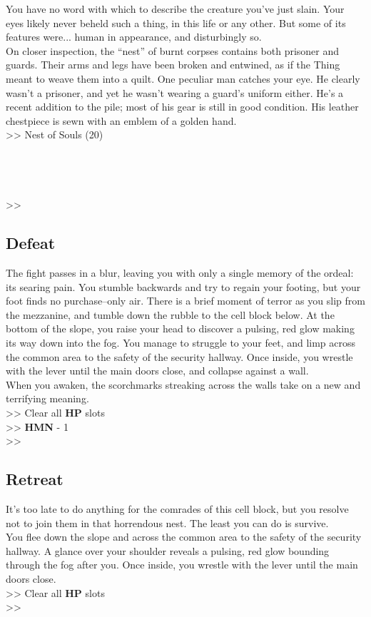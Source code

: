 You have no word with which to describe the creature you’ve just slain. Your eyes likely never beheld such a thing, in this life or any other. But some of its features were... human in appearance, and disturbingly so.\\

On closer inspection, the “nest” of burnt corpses contains both prisoner and guards. Their arms and legs have been broken and entwined, as if the Thing meant to weave them into a quilt. One peculiar man catches your eye. He clearly wasn’t a prisoner, and yet he wasn’t wearing a guard’s uniform either. He’s a recent addition to the pile; most of his gear is still in good condition. His leather chestpiece is sewn with an emblem of a golden hand.\\

>> Nest of Souls (20)\\
\\
\\
\\
\\
>> 

\subsection*{Defeat}
The fight passes in a blur, leaving you with only a single memory of the ordeal: its searing pain. You stumble backwards and try to regain your footing, but your foot finds no purchase--only air. There is a brief moment of terror as you slip from the mezzanine, and tumble down the rubble to the cell block below. At the bottom of the slope, you raise your head to discover a pulsing, red glow making its way down into the fog. You manage to struggle to your feet, and limp across the common area to the safety of the security hallway. Once inside, you wrestle with the lever until the main doors close, and collapse against a wall.\\

When you awaken, the scorchmarks streaking across the walls take on a new and terrifying meaning.\\

>> Clear all \textbf{HP} slots\\
>> \textbf{HMN} - 1\\
>> 

\subsection*{Retreat}
It’s too late to do anything for the comrades of this cell block, but you resolve not to join them in that horrendous nest. The least you can do is survive.\\

You flee down the slope and across the common area to the safety of the security hallway. A glance over your shoulder reveals a pulsing, red glow bounding through the fog after you. Once inside, you wrestle with the lever until the main doors close.\\

>> Clear all \textbf{HP} slots\\
>> 
